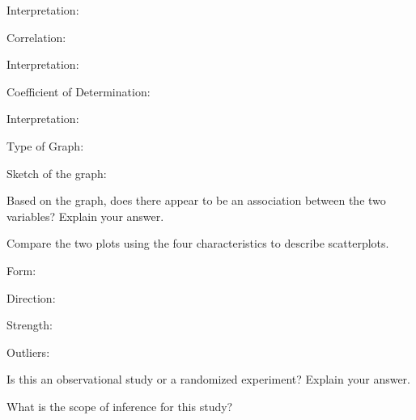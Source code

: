 \documentclass[
]{report}
\newcommand{\rgi}{\hspace{24pt}}  %
\begin{document}
\rgi \rgi Interpretation:

\vspace{0.3in}

\rgi Correlation:

\vspace{0.2in}

\rgi \rgi Interpretation:

\vspace{0.3in}

\rgi Coefficient of Determination:

\vspace{0.2in}

\rgi \rgi Interpretation:

\vspace{0.3in}

\rgi Type of Graph:

\vspace{0.3in}

\rgi Sketch of the graph:

\vspace{1.5in}

\rgi \rgi Based on the graph, does there appear to be an association between the two variables? Explain your answer.

\vspace{0.5in}

\rgi \rgi Compare the two plots using the four characteristics to describe scatterplots.

\rgi \rgi Form:

\vspace{0.2in}

\rgi \rgi Direction:

\vspace{0.2in}

\rgi \rgi Strength:

\vspace{0.2in}

\rgi \rgi Outliers:

\vspace{0.2in}

\rgi Is this an observational study or a randomized experiment? Explain your answer.

\vspace{0.5in}

\rgi What is the scope of inference for this study?

\vspace{0.3in}
\end{document}
